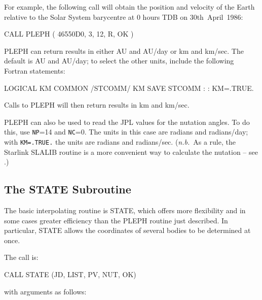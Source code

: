 \documentclass[twoside,11pt,nolof]{starlink}
\begin{document}
For example, the following call will obtain the position and velocity of the
Earth relative to the Solar System barycentre at 0 hours TDB on
30th~April~1986:

\begin{terminalv}
CALL PLEPH ( 46550D0, 3, 12, R, OK )
\end{terminalv}

PLEPH can return results in either AU and AU/day or km and km/sec.
The default is AU and AU/day; to select the other units, include the
following Fortran statements:

\begin{terminalv}
LOGICAL KM
COMMON /STCOMM/ KM
SAVE STCOMM
   :
   :
KM=.TRUE.
\end{terminalv}

Calls to PLEPH will then return results in km and km/sec.

PLEPH can also be used to read the JPL values for the nutation angles.
To do this, use \texttt{NP}=14 and \texttt{NC}=0.  The units in this
case are radians and radians/day;  with \texttt{KM=.TRUE.} the units are
radians and radians/sec.  (\textit{n.b.}\ As a rule, the Starlink SLALIB
routine  is a more convenient way to
calculate the nutation -- see .)

\subsection{The STATE Subroutine}
\label{the_state_subroutine}

The basic interpolating routine is STATE, which offers more
flexibility and in some cases
greater efficiency than the PLEPH routine just described.
In particular, STATE allows the coordinates of several bodies to be
determined at once.

The call is:

\begin{terminalv}
CALL STATE (JD, LIST, PV, NUT, OK)
\end{terminalv}

with arguments as follows:
\end{document}
